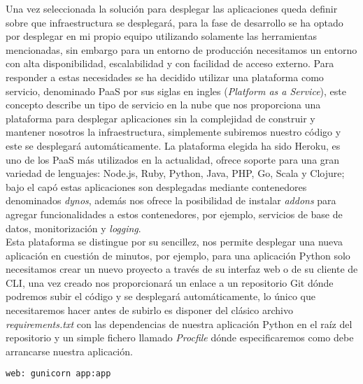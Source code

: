 \documentclass[../proyecto.tex]{subfiles}
\begin{document}
Una vez seleccionada la solución para desplegar las aplicaciones queda definir sobre que infraestructura se desplegará, para la fase de desarrollo se ha optado por desplegar en mi propio equipo utilizando solamente las herramientas mencionadas, sin embargo para un entorno de producción necesitamos un entorno con alta disponibilidad, escalabilidad y con facilidad de acceso externo. Para responder a estas necesidades se ha decidido utilizar una plataforma como servicio, denominado PaaS por sus siglas en ingles (\textit{Platform as a Service}), este concepto describe un tipo de servicio en la nube que nos proporciona una plataforma para desplegar aplicaciones sin la complejidad de construir y mantener nosotros la infraestructura, simplemente subiremos nuestro código y este se desplegará automáticamente. La plataforma elegida ha sido Heroku, es uno de los PaaS más utilizados en la actualidad, ofrece soporte para una gran variedad de lenguajes: Node.js, Ruby, Python, Java, PHP, Go, Scala y Clojure; bajo el capó estas aplicaciones son desplegadas mediante contenedores denominados \textit{dynos}, además nos ofrece la posibilidad de instalar \textit{addons} para agregar funcionalidades a estos contenedores, por ejemplo, servicios de base de datos, monitorización y \textit{logging}.\\

 Esta plataforma se distingue por su sencillez, nos permite desplegar una nueva aplicación en cuestión de minutos, por ejemplo, para una aplicación Python solo necesitamos crear un nuevo proyecto a través de su interfaz web o de su cliente de CLI, una vez creado nos proporcionará un enlace a un repositorio Git dónde podremos subir el código y se desplegará automáticamente, lo único que necesitaremos hacer antes de subirlo es disponer del clásico archivo \textit{requirements.txt} con las dependencias de nuestra aplicación Python en el raíz del repositorio y un simple fichero llamado \textit{Procfile} dónde especificaremos como debe arrancarse nuestra aplicación.\\

 \begin{minipage}{\linewidth}
 \begin{lstlisting}[caption=Ejemplo de fichero Procfile para desplegar una aplicación Flask en Heroku , captionpos=b, frame=single]
 web: gunicorn app:app
 \end{lstlisting}
 \end{minipage}
\end{document}
